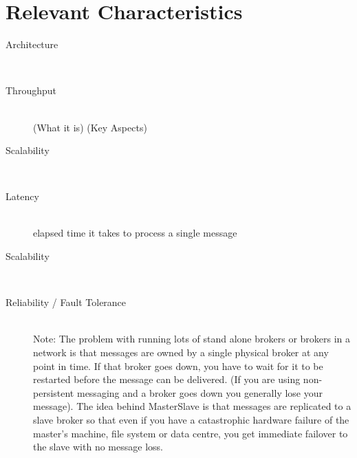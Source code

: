 \section{Relevant Characteristics}
\begin{description}
    \item [Architecture] \hfill \\
    { }
    \item [Throughput] \hfill \\
        { (What it is) (Key Aspects)}
    \item [Scalability] \hfill \\
    {}
    \item [Latency]\hfill \\
    {elapsed time it takes to process a single message   }
    \item [Scalability] \hfill \\
    {}
    \item [Reliability / Fault Tolerance] \hfill \\
        {Note: The problem with running lots of stand alone brokers or brokers in a
        network is that messages are owned by a single physical broker at any
    point in time. If that broker goes down, you have to wait for it to be
restarted before the message can be delivered. (If you are using non-persistent
messaging and a broker goes down you generally lose your message). The idea
behind MasterSlave is that messages are replicated to a slave broker so that
even if you have a catastrophic hardware failure of the master's machine, file
system or data centre, you get immediate failover to the slave with no message
loss.}


\end{description}
